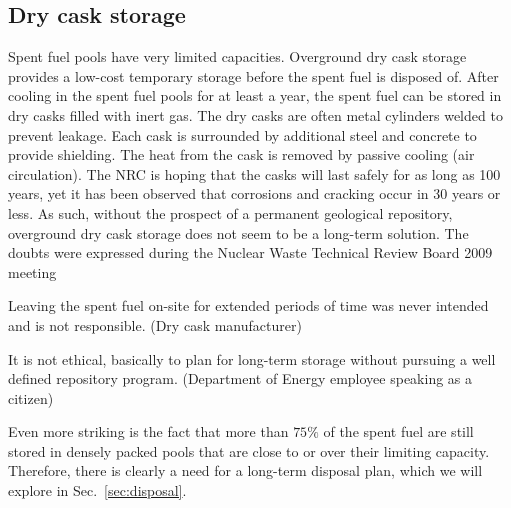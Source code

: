 \documentclass[nofootinbib,preprint,aps]{revtex4-1}
\begin{document}
    \subsection{Dry cask storage}
    Spent fuel pools have very limited capacities. 
    Overground dry cask storage provides a low-cost temporary storage before the spent fuel is disposed of.
    After cooling in the spent fuel pools for at least a year, the spent fuel can be stored in dry casks filled with inert gas. 
The dry casks are often metal cylinders welded to prevent leakage. Each cask is surrounded by
    additional steel and concrete to provide shielding.
    The heat from the cask is removed by passive
    cooling (air circulation). The NRC is hoping that the casks will
    last safely for as long as 100 years, yet it has been observed that corrosions and cracking occur in 30 years
    or less.\cite{aa12} As such, without the prospect of a permanent geological repository,
    overground dry cask storage does not seem to be a long-term solution. The doubts were expressed
    during the Nuclear Waste Technical Review Board 2009 meeting \cite{nwtb09, aa12}
    \begin{displayquote}
    Leaving the spent fuel on-site for extended periods of time was never intended and is not
    responsible. (Dry cask manufacturer)

    It is not ethical, basically to plan for long-term storage without pursuing a well defined repository
    program. (Department of Energy employee speaking as a citizen)
    \end{displayquote}
    Even more striking is the fact that more than $75\%$ of the spent fuel are still stored in densely
    packed pools
    that are close to or over their limiting capacity.\cite{a11,aa12}
    Therefore, there is clearly a need for a long-term disposal plan, which we will explore in
    Sec.~\ref{sec:disposal}.
\end{document}
